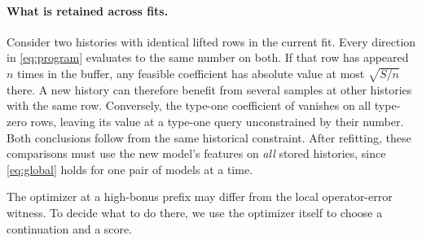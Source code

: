 \paragraph{What is retained across fits.}
Consider two histories with identical lifted rows in the current fit. Every direction in \eqref{eq:program} evaluates to the same number on both. If that row has appeared $n$ times in the buffer, any feasible coefficient has absolute value at most $\sqrt{S/n}$ there. A new history can therefore benefit from several samples at other histories with the same row. Conversely, the type-one coefficient of  vanishes on all type-zero rows, leaving its value at a type-one query unconstrained by their number. Both conclusions follow from the same historical constraint. After refitting, these comparisons must use the new model's features on \emph{all} stored histories, since \eqref{eq:global} holds for one pair of models at a time.

The optimizer at a high-bonus prefix may differ from the local operator-error witness. To decide what to do there, we use the optimizer itself to choose a continuation and a score.

